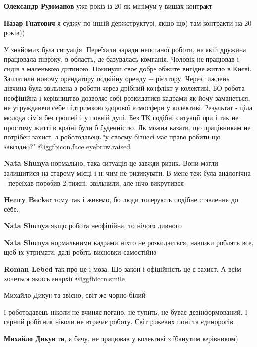 \begin{itemize}
\begin{itemize}
\textbf{Олександр Рудоманов} уже років із 20 як мінімум у вишах контракт

\textbf{Назар Гнатович} я суджу по іншій держструктурі, якщо що) там контракти на 20 років))
\end{itemize} %


У знайомих була ситуація. Переїхали заради непоганої роботи, на якій дружина
працювала півроку, в область, де базувалась компанія. Чоловік не працював і
сидів з маленькою дитиною. Покинули своє добре обжите вигідне житло в Києві.
Заплатили новому орендатору подвійну оренду + рієлтору. Через тиждень дівчина
була звільнена з роботи через дрібний конфлікт у колективі, БО робота
неофіційна і керівництво дозволяє собі розкидатися кадрами як йому заманеться,
не утруждаючи себе підтримкою здорової атмосфери у колективі. Результат - ціла
молода сім'я без грошей і у повній дупі. Без ТК подібні ситуації при і так не
простому житті в країні були б буденністю. Як можна казати, що працівникам не
потрібен захист, а роботодавець "у своєму бізнесі має право робити що
завгодно?"  @igg{fbicon.face.eyebrow.raised} 

\begin{itemize} %
\textbf{Nata Shunya} нормально, така ситуація це завжди ризик. Вони могли залишитися на старому місці і ні чим не ризикувати. В мене теж була аналогічна - переїхав поробив 2 тижні, звільнили, але нічо викрутився

\textbf{Henry Becker} тому так і живемо, бо люди толерують подібне ставлення до себе.

\textbf{Nata Shunya} якщо робота неофіційна, то нічого дивного

\textbf{Nata Shunya} нормальними кадрами ніхто не розкидається, навпаки роблять все, щоб їх утримати. далі робіть висновки самостійно

\textbf{Roman Lebed} так про це і мова. Що закон і офіційність це є захист. А всім хочеться якоїсь анархії  @igg{fbicon.smile} 

Михайло Дикун та звісно, світ же чорно-білий

І роботодавець ніколи не вчиняє погано, не тупить, не буває дезінформований. І гарний робітник ніколи не втрачає роботу. Світ рожевих поні та єдинорогів.

\textbf{Михайло Дикун} ти, я бачу, не працював у колективі з їбанутим керівником)


\end{itemize}
\end{itemize}
